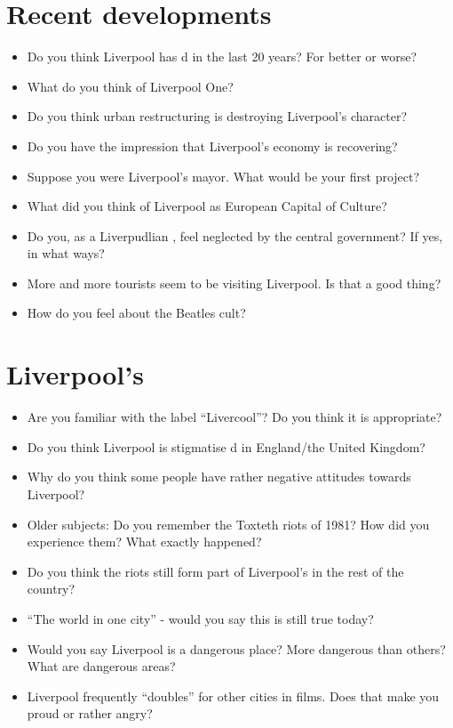 	\section*{Recent developments}
	\begin{multicols}{2}
		\begin{itemize}
			\item Do you think Liverpool has d in the last 20 years? For better or worse?
			\item What do you think of Liverpool One?
			\item Do you think urban restructuring is destroying Liverpool's character?
			\item Do you have the impression that Liverpool's economy is recovering?
			\item Suppose you were Liverpool's mayor. What would be your first project?
			\item What did you think of Liverpool as European Capital of Culture?
			\item Do you, as a Liverpudlian , feel neglected by the central government? If yes, in what ways?
			\item More and more tourists seem to be visiting Liverpool. Is that a good thing?
			\item How do you feel about the Beatles cult?
		\end{itemize}
	\end{multicols}
	
	\section*{Liverpool's }
	\begin{multicols}{2}
		\begin{itemize}
			\item Are you familiar with the label “Livercool”? Do you think it is appropriate?
			\item Do you think Liverpool is stigmatise d in England/the United Kingdom?
			\item Why do you think some people have rather negative attitudes towards Liverpool?
			\item Older subjects: Do you remember the Toxteth riots of 1981? How did you experience them? What exactly happened?
			\item Do you think the riots still form part of Liverpool's  in the rest of the country?
			\item ``The world in one city'' - would you say this is still true today?
			\item Would you say Liverpool is a dangerous place? More dangerous than others? What are dangerous areas?
			\item Liverpool frequently ``doubles'' for other cities in films. Does that make you proud or rather angry?
		\end{itemize}
	\end{multicols}
	

